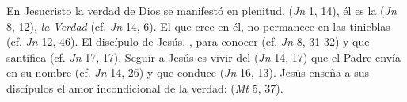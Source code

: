  En Jesucristo la verdad de Dios se manifestó en plenitud.  (\emph{Jn} 1, 14), él es la  (\emph{Jn} 8, 12), \emph{la Verdad} (cf. \emph{Jn} 14, 6). El que cree en él, no permanece en las tinieblas (cf. \emph{Jn} 12, 46). El discípulo de Jesús, , para conocer  (cf. \emph{Jn} 8, 31-32) y que santifica (cf. \emph{Jn} 17, 17). Seguir a Jesús es vivir del  (\emph{Jn} 14, 17) que el Padre envía en su nombre (cf. \emph{Jn} 14, 26) y que conduce  (\emph{Jn} 16, 13). Jesús enseña a sus discípulos el amor incondicional de la verdad:  (\emph{Mt} 5, 37).